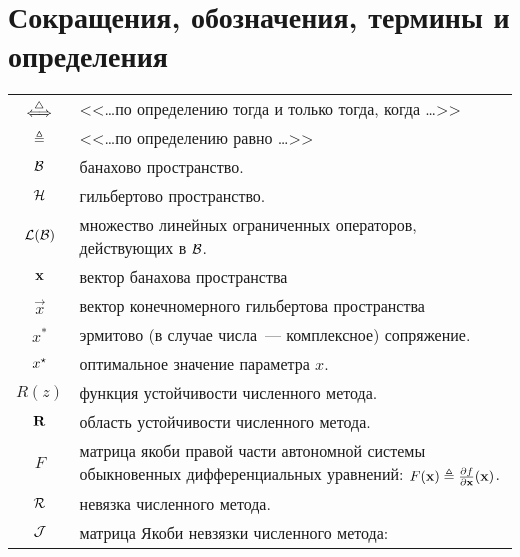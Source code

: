 \chapter*{Сокращения, обозначения, термины и определения}
\label{chapter:definitions} 

\begin{center}
    \begin{tabularx}{\textwidth}{cl}
        $ \overset{\triangle}{\Longleftrightarrow} $                      & <<\ldots по определению тогда и только тогда, когда \ldots>> \\
        $ \triangleq $                       & <<\ldots по определению равно \ldots>> \\
        \rule{0pt}{16pt}%
        $ \mathcal{B} $                 & банахово пространство. \\
        $ \mathcal{H} $                & гильбертово пространство. \\
        $ \mathcal{L}(\mathcal{B}) $      & \makecell[l]{множество линейных ограниченных операторов, \\
                                                        действующих в $ \mathcal{B} $.} \\
        $ \mathbf{x} $                     & вектор банахова пространства \\
        $ \vec{x} $                      & вектор конечномерного гильбертова пространства \\
        $ x^* $                          & эрмитово (в случае числа~--- комплексное) сопряжение. \\
        $ x^\star $                   & оптимальное значение параметра $ x $. \\
        \rule{0pt}{16pt}%
        $ R(z) $                         & функция устойчивости численного метода. \\
        $ \mathbf{R} $                     & область устойчивости численного метода. \\
        $ F $                            & \makecell[l]{матрица якоби правой части автономной системы \\
                                                        обыкновенных дифференциальных уравнений:
                                                        $ F(\mathbf{x}) \triangleq \frac{\partial f}{\partial \mathbf{x}}(\mathbf{x}) $.} \\
        $ \mathcal{R} $                         & невязка численного метода. \\
        $ \mathcal{J} $                         & матрица Якоби невзязки численного метода:

\end{tabularx}
\end{center}
